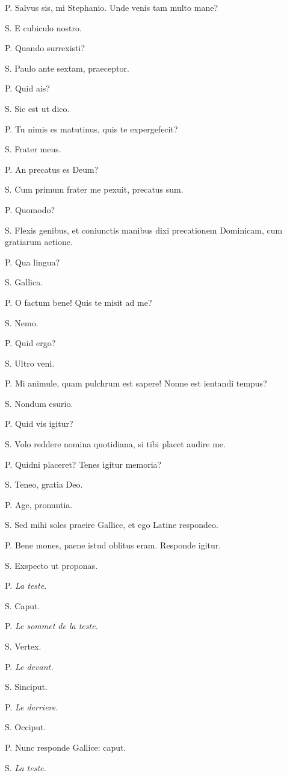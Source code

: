 \documentclass{article}
\newcommand{\fr}[1]{\foreignlanguage{french}{\emph{#1}}}
\begin{document}
P. Salvus sis, mi Stephanio. Unde venis tam multo mane?

S. E cubiculo nostro.

P. Quando surrexisti?

S. Paulo ante sextam, praeceptor.

P. Quid ais?

S. Sic est ut dico.

P. Tu nimis es matutinus, quis te expergefecit?

S. Frater meus.

P. An precatus es Deum?

S. Cum primum frater me pexuit, precatus sum.

P. Quomodo?

S. Flexis genibus, et coniunctis manibus dixi precationem Dominicam, cum gratiarum actione.

P. Qua lingua?

S. Gallica.

P. O factum bene! Quis te misit ad me?

S. Nemo.

P. Quid ergo?

S. Ultro veni.

P. Mi animule, quam pulchrum est sapere! Nonne est ientandi tempus?

S. Nondum esurio.

P. Quid vis igitur?

S. Volo reddere nomina quotidiana, si tibi placet audire me.

P. Quidni placeret? Tenes igitur memoria?

S. Teneo, gratia Deo.

P. Age, pronuntia.

S. Sed mihi soles praeire Gallice, et ego Latine respondeo.

P. Bene mones, paene istud oblitus eram. Responde igitur.

S. Exspecto ut proponas.

P. \fr{La teste.}

S. Caput.

P. \fr{Le sommet de la teste.}

S. Vertex.

P. \fr{Le devant.}

S. Sinciput.

P. \fr{Le derriere.}

S. Occiput.

P. Nunc responde Gallice: caput.

S. \fr{La teste.}
\end{document}
